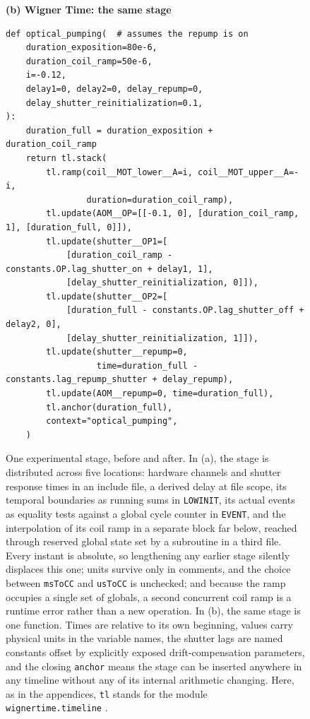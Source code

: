 \documentclass{SciPost}
\newcommand{\mintedsmall}{\fontsize{4pt}{4.8pt}\selectfont}
\newcommand{\python}[1]{%
  \texttt{#1}%
}
\begin{document}
\begin{figure}
\vspace{\baselineskip}
 
\begin{minipage}{.9\linewidth}
\textbf{(b) Wigner Time: the same stage}
\begin{verbatim}
def optical_pumping(  # assumes the repump is on
    duration_exposition=80e-6,
    duration_coil_ramp=50e-6,
    i=-0.12,
    delay1=0, delay2=0, delay_repump=0,
    delay_shutter_reinitialization=0.1,
):
    duration_full = duration_exposition + duration_coil_ramp
    return tl.stack(
        tl.ramp(coil__MOT_lower__A=i, coil__MOT_upper__A=-i,
                duration=duration_coil_ramp),
        tl.update(AOM__OP=[[-0.1, 0], [duration_coil_ramp, 1], [duration_full, 0]]),
        tl.update(shutter__OP1=[
            [duration_coil_ramp - constants.OP.lag_shutter_on + delay1, 1],
            [delay_shutter_reinitialization, 0]]),
        tl.update(shutter__OP2=[
            [duration_full - constants.OP.lag_shutter_off + delay2, 0],
            [delay_shutter_reinitialization, 1]]),
        tl.update(shutter__repump=0,
                  time=duration_full - constants.lag_repump_shutter + delay_repump),
        tl.update(AOM__repump=0, time=duration_full),
        tl.anchor(duration_full),
        context="optical_pumping",
    )
\end{verbatim}
\end{minipage}
 
\caption{\label{fig:before_after} One experimental stage, before and after. In
(a), the stage is distributed across five locations: hardware channels and
shutter response times in an include file, a derived delay at file scope, its
temporal boundaries as running sums in \texttt{LOWINIT}, its actual events as
equality tests against a global cycle counter in \texttt{EVENT}, and the
interpolation of its coil ramp in a separate block far below, reached through
reserved global state set by a subroutine in a third file. Every instant is
absolute, so lengthening any earlier stage silently displaces this one; units
survive only in comments, and the choice between \texttt{msToCC} and
\texttt{usToCC} is unchecked; and because the ramp occupies a single set of
globals, a second concurrent coil ramp is a runtime error rather than a new
operation.
In (b), the same stage is one function. Times are relative to its own
beginning, values carry physical units in the variable names, the shutter lags
are named constants offset by explicitly exposed drift-compensation parameters,
and the closing \python{anchor} means the stage can be inserted anywhere in any
timeline without any of its internal arithmetic changing. Here, as in the
appendices, \python{tl} stands for the module \python{wignertime.timeline}.
}
\end{figure}
 
\end{document}
